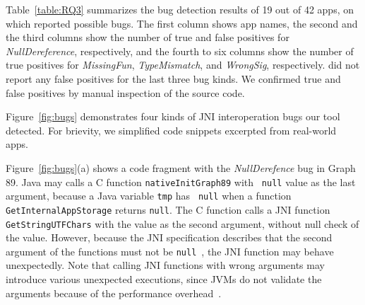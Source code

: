 Table~\ref{table:RQ3} summarizes the bug detection results of 19 out of 42
apps, on which \ours reported possible bugs.  The first
column shows app names, the second and the third columns show the
number of true and false positives for {\it NullDereference}, respectively, and
the fourth to six columns show the number of true positives for {\it
MissingFun}, {\it TypeMismatch}, and {\it WrongSig}, respectively.
\ours did not report any false positives for the last three bug kinds.
We confirmed true and false positives by manual inspection of the source code. 




Figure~\ref{fig:bugs} demonstrates four kinds of JNI interoperation bugs our
tool detected.  For brievity, we simplified code snippets excerpted from
real-world apps. 

Figure~\ref{fig:bugs}(a) shows a code fragment with the {\it NullDerefence} bug
in Graph 89. Java may calls a C function {\tt nativeInitGraph89} with {\tt
null} value as the last argument, because a Java variable {\tt tmp} has {\tt
null} when a function {\tt GetInternalAppStorage} returns {\tt null}.  The C
function calls a JNI function {\tt GetStringUTFChars} with the value as the
second argument, without null check of the value. However, because the JNI
specification describes that the second argument of the functions must not be
{\tt null}~\cite{getstringutfchars}, the JNI function may behave unexpectedly.
Note that calling JNI functions with wrong arguments may introduce various
unexpected executions, since JVMs do not validate the arguments because of the
performance overhead~\cite{hwang2021justgen}.

